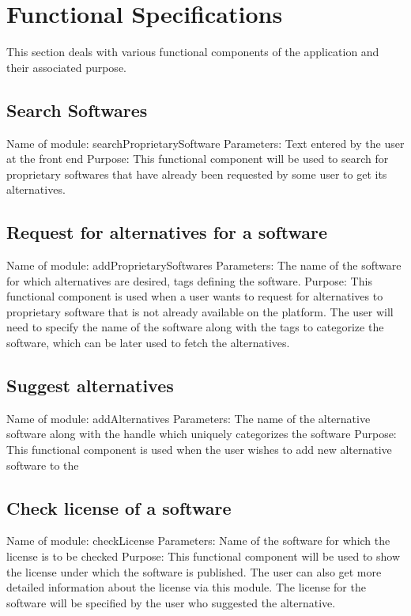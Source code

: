 \section{Functional Specifications}
This section deals with various functional components of the application and their associated purpose.

\subsection{Search Softwares}
Name of module: searchProprietarySoftware
Parameters: Text entered by the user at the front end
Purpose: This functional component will be used to search for proprietary softwares that 
have already been requested by some user to get its alternatives.

\subsection{Request for alternatives for a software}

Name of module: addProprietarySoftwares
Parameters: The name of the software for which alternatives are desired, tags defining the software.
Purpose: This functional component is used when a user wants to request for alternatives to proprietary software that is not already available on the platform. The user will need to specify the name of the software along with the tags to categorize the software, which can be later used to fetch the alternatives.

\subsection{Suggest alternatives}

Name of module: addAlternatives
Parameters: The name of the alternative software along with the handle which uniquely categorizes the software 
Purpose: This functional component is used when the user wishes to add new alternative software to the 

\subsection{Check license of a software}

Name of module: checkLicense
Parameters: Name of the software for which the license is to be checked
Purpose: This functional component will be used to show the license under which the software is published. The user can also get more detailed information about the license via this module. The license for the software will be specified by the user who suggested the alternative.

